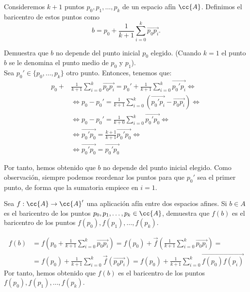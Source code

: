 \begin{ejercicio}
    Consideremos $k + 1$ puntos $p_0, p_1, \dots , p_k$ de un espacio afín $\cc{A}$. Definimos el baricentro de estos puntos como
    \begin{equation*}
        b=p_0+\frac{1}{k+1} \sum_{i=0}^k \vec{p_0p_i}.
    \end{equation*}

    Demuestra que $b$ no depende del punto inicial $p_0$ elegido. (Cuando $k = 1$ el punto $b$ se le denomina el punto medio de $p_0$ y $p_1$).\\

    Sea $p_0'\in \{p_0,\dots,p_k\}$ otro punto. Entonces, tenemos que:
    \begin{equation*}\begin{split}
        p_0+&\frac{1}{k+1}\sum_{i=0}^k \vec{p_0p_i} = p_0'+ \frac{1}{k+1}\sum_{i=0}^k \vec{p_0'p_i} \Longleftrightarrow \\
        &\Longleftrightarrow p_0-p_0' = \frac{1}{k+1}\sum_{i=0}^{k}\left(\vec{p_0'p_i} - \vec{p_0p_i}\right) \Longleftrightarrow\\
        &\Longleftrightarrow p_0-p_0' = \frac{1}{k+0}\sum_{i=0}^{k}\vec{p_0'p_0} \Longleftrightarrow\\
        &\Longleftrightarrow \vec{p_0'p_0} = \frac{k+1}{k+1}\vec{p_0'p_0} \Longleftrightarrow\\
        &\Longleftrightarrow \vec{p_0'p_0} = \vec{p_0'p_0}
    \end{split}\end{equation*}

    Por tanto, hemos obtenido que $b$ no depende del punto inicial elegido. Como observación, siempre podemos reordenar los puntos para que $p_0'$ sea el primer punto, de forma que la sumatoria empiece en $i=1$.
\end{ejercicio}

\begin{ejercicio}
    Sea $f : \cc{A} \to \cc{A}'$ una aplicación afín entre dos espacios afines. Si $b \in A$ es el baricentro de los puntos $p_0, p_1, \dots , p_k \in \cc{A}$, demuestra que $f (b)$ es el baricentro de los puntos $f (p_0), f (p_1), \dots , f (p_k)$.

    \begin{equation*}
        \begin{split}
            f(b) &= f\left(p_0+\frac{1}{k+1}\sum_{i=0}^k \vec{p_0p_i}\right) = f(p_0)+\vec{f}\left(\frac{1}{k+1}\sum_{i=0}^k \vec{p_0p_i}\right) =\\
            &= f(p_0)+\frac{1}{k+1}\sum_{i=0}^k \vec{f}(\vec{p_0p_i}) = f(p_0)+\frac{1}{k+1}\sum_{i=0}^k \vec{f(p_0)f(p_i)}
        \end{split}
    \end{equation*}
    Por tanto, hemos obtenido que $f(b)$ es el baricentro de los puntos $f(p_0), f(p_1), \dots , f(p_k)$.
\end{ejercicio}

